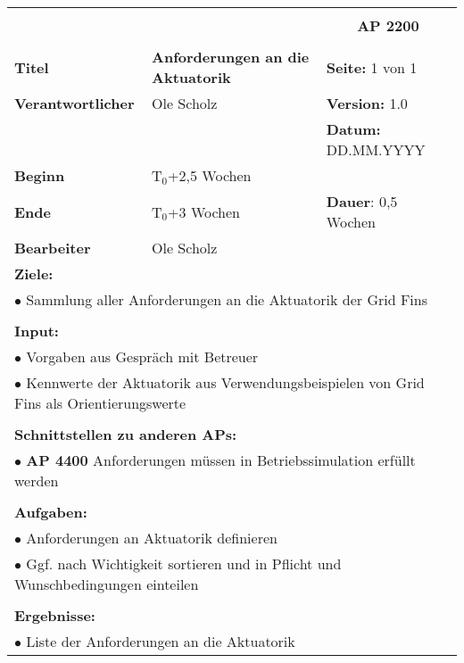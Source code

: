 \clearpage
\begin{table}[!h]
	\begin{center}
		\begin{tabular}{|p{35mm}||p{55mm}|p{50mm}||p{40mm}|}
			\hline
			\multicolumn{3}{|l||}{\textbf{}} & \multicolumn{1}{c|}{}\\
			\multicolumn{3}{|l||}{\textbf{}} & \multicolumn{1}{c|}{\textbf{AP 2200}}\\
			\multicolumn{3}{|l||}{\textbf{}} & \multicolumn{1}{c|}{}\\
			\hline\hline
			\textbf{Titel} & \multicolumn{2}{p{7cm}||}{\textbf{Anforderungen an die Aktuatorik}} 
			& \textbf{Seite:} 1 von 1\\
			\hline
			\textbf{Verantwortlicher} & \multicolumn{2}{l||}{Ole Scholz} & \textbf{Version:} 1.0\\
			\hline
			\multicolumn{3}{|l||}{} & \textbf{Datum:} DD.MM.YYYY\\
			\hline\hline
			\textbf{Beginn} & \multicolumn{2}{l||}{T$_0$+2,5 Wochen} & \\
			\hline
			\textbf{Ende} & \multicolumn{2}{l||}{T$_0$+3 Wochen} & \textbf{Dauer}: 0,5 Wochen\\
			\hline\hline
			\textbf{Bearbeiter} & \multicolumn{3}{l|}{Ole Scholz}\\
			\hline\hline
			\multicolumn{4}{|p{150mm}|}{\textbf{Ziele:}}\\
			\multicolumn{4}{|p{150mm}|}{$\bullet$ Sammlung aller Anforderungen an die Aktuatorik der Grid Fins}\\
			\multicolumn{4}{|p{150mm}|}{}\\
			\multicolumn{4}{|p{150mm}|}{\textbf{Input:}}\\
			\multicolumn{4}{|p{150mm}|}{$\bullet$ Vorgaben aus Gespräch mit Betreuer}\\
			\multicolumn{4}{|p{150mm}|}{$\bullet$ Kennwerte der Aktuatorik aus Verwendungsbeispielen von Grid Fins als Orientierungswerte}\\
			\multicolumn{4}{|p{150mm}|}{}\\
			\multicolumn{4}{|p{150mm}|}{\textbf{Schnittstellen zu anderen APs:}}\\
			\multicolumn{4}{|p{150mm}|}{$\bullet$ \textbf{AP 4400} Anforderungen müssen in Betriebssimulation erfüllt werden}\\
			\multicolumn{4}{|p{150mm}|}{}\\
			\multicolumn{4}{|p{150mm}|}{\textbf{Aufgaben:}}\\
			\multicolumn{4}{|p{150mm}|}{$\bullet$ Anforderungen an Aktuatorik definieren}\\
			\multicolumn{4}{|p{150mm}|}{$\bullet$ Ggf. nach Wichtigkeit sortieren und in Pflicht und Wunschbedingungen einteilen}\\
			\multicolumn{4}{|p{150mm}|}{}\\
			\multicolumn{4}{|p{150mm}|}{\textbf{Ergebnisse:}}\\
			\multicolumn{4}{|p{150mm}|}{$\bullet$ Liste der Anforderungen an die Aktuatorik}\\
			\hline
		\end{tabular}
	\end{center}
\end{table}

